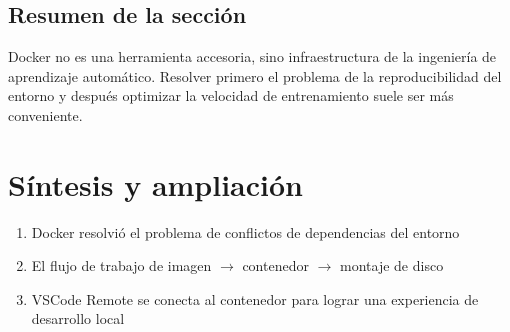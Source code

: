 \documentclass[a4paper]{article}
\begin{document}
\subsection{Resumen de la sección}
Docker no es una herramienta accesoria, sino infraestructura de la ingeniería de aprendizaje automático. Resolver primero el problema de la reproducibilidad del entorno y después optimizar la velocidad de entrenamiento suele ser más conveniente.

\newpage
\section{Síntesis y ampliación}
\begin{enumerate}
  \item Docker resolvió el problema de conflictos de dependencias del entorno
  \item El flujo de trabajo de imagen $\to$ contenedor $\to$ montaje de disco
  \item VSCode Remote se conecta al contenedor para lograr una experiencia de desarrollo local
\end{enumerate}
\end{document}
